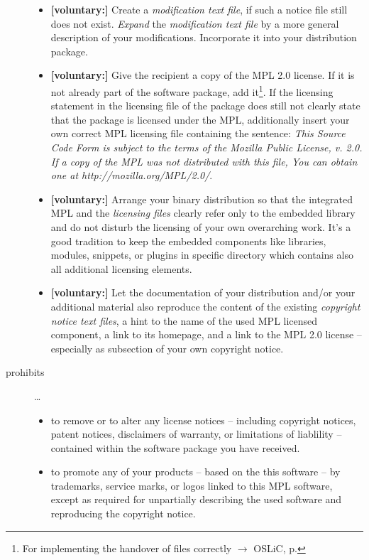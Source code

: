 \begin{description}
\begin{itemize}
  \item \textbf{[voluntary:]} Create a \emph{modification text file}, if such a
  notice file still does not exist. \emph{Expand} the \emph{modification text
  file} by a more general description of your modifications. Incorporate it into
  your distribution package.
  
  \item \textbf{[voluntary:]} Give the recipient a copy of the MPL 2.0 license.
  If it is not already part of the software package, add it\footnote{For
  implementing the handover of files correctly $\rightarrow$ OSLiC, p.
  \pageref{DistributingFilesHint}}. If the licensing statement in the licensing
  file of the package does still not clearly state that the package is licensed
  under the MPL, additionally insert your own correct MPL licensing file
  containing the sentence: \emph{This Source Code Form is subject to the terms
  of the Mozilla Public License, v. 2.0. If a copy of the MPL was not
  distributed with this file, You can obtain one at
  http://mozilla.org/MPL/2.0/}.

  \item \textbf{[voluntary:]} Arrange your binary distribution so that the
  integrated MPL and the \emph{licensing files} clearly refer only to the
  embedded library and do not disturb the licensing of your own overarching
  work. It's a good tradition to keep the embedded components like libraries,
  modules, snippets, or plugins in specific directory which contains also all
  additional licensing elements.
  
  
  \item \textbf{[voluntary:]} Let the documentation of your distribution and/or
  your additional material  also reproduce the content of the existing
  \emph{copyright notice text files}, a hint to the name of the used MPL
  licensed component, a link to its homepage, and a link to the MPL 2.0 license
  -- especially as subsection of your own copyright notice.
  
\end{itemize}

\item[prohibits] \ldots
\begin{itemize}
  \item to remove or to alter any license notices -- including copyright
  notices, patent notices, disclaimers of warranty, or limitations of liablility
  -- contained within the software package you have received.
  \item to promote any of your products -- based on the this software -- by
  trademarks, service marks, or logos linked to this MPL software, except as
  required for unpartially describing the used software and reproducing the
  copyright notice.
\end{itemize}

\end{description}

